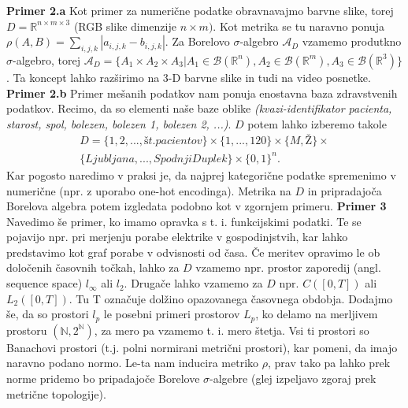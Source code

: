 \documentclass[mat1]{article}
\theoremstyle{definition}
\begin{document}
\newline
\newline
\textbf{Primer 2.a}  Kot primer za numerične podatke obravnavajmo barvne slike, torej $D = \mathbb{R}^{n\times m \times 3}$ (RGB slike dimenzije $n \times m)$. Kot metrika se tu naravno ponuja $\rho(A,B)=\sum_{i,j,k}  |a_{i,j,k}-b_{i,j,k}|$. Za Borelovo $\sigma$-algebro $\mathcal{A}_{D}$  vzamemo produtkno $\sigma$-algebro, torej  $\mathcal{A}_{D}=\{A_{1} \times A_{2} \times A_{3} | A_{1} \in \mathcal{B}(\mathbb{R}^n),  A_{2} \in \mathcal{B}(\mathbb{R}^m),  A_{3} \in \mathcal{B}(\mathbb{R}^3) \}$. Ta koncept lahko razširimo na 3-D barvne slike in tudi na video posnetke.
\newline
\newline
\textbf{Primer 2.b} Primer mešanih podatkov nam ponuja enostavna baza zdravstvenih podatkov. Recimo, da so elementi naše baze oblike \textit{(kvazi-identifikator pacienta, starost, spol, bolezen, bolezen 1, bolezen 2, ...)}. $D$ potem lahko izberemo takole 
\begin{equation*}
\begin{split}
D=\{1,2,...,št. pacientov\} \times \{1,...,120\} \times \{M,Ž\} \times \\
\{Ljubljana, ... , Spodnji Duplek\} \times \{0,1\}^n.
\end{split}
\end{equation*}
Kar pogosto naredimo v praksi je, da najprej kategorične podatke spremenimo v numerične (npr. z uporabo one-hot encodinga). Metrika na $D$ in pripradajoča Borelova algebra potem izgledata podobno kot v zgornjem primeru.
\newline
\newline
\textbf{Primer 3} Navedimo še primer, ko imamo opravka s t. i. funkcijskimi podatki. Te se pojavijo npr. pri merjenju porabe elektrike v gospodinjstvih, kar lahko predstavimo kot graf porabe v odvisnosti od časa. Če meritev opravimo le ob določenih časovnih točkah, lahko za $D$ vzamemo npr. prostor zaporedij (angl. sequence space) $l_{\infty}$ ali $l_{2}$. Drugače lahko vzamemo za $D$ npr. $C([0,T])$ ali $L_{2}([0,T])$. Tu T označuje dolžino opazovanega časovnega obdobja. Dodajmo še, da so prostori $l_p$ le posebni primeri prostorov $L_p$, ko delamo na merljivem prostoru $(\mathbb{N}, 2^\mathbb{N})$, za mero pa vzamemo t. i. mero štetja. Vsi ti prostori so Banachovi prostori (t.j. polni normirani metrični prostori), kar pomeni, da imajo naravno podano normo. Le-ta nam inducira metriko $\rho$, prav tako pa lahko prek norme pridemo bo pripadajoče Borelove $\sigma$-algebre (glej izpeljavo zgoraj prek metrične topologije). 
\end{document}
